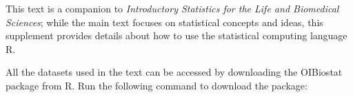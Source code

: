 % 
% 
% 
% 
% 
% 






\vspace{1cm}
This text is a companion to \textit{Introductory Statistics for the Life and Biomedical Sciences}; while the main text focuses on statistical concepts and ideas, this supplement provides details about how to use the statistical computing language \textsf{R}.

All the datasets used in the text can be accessed by downloading the OIBiostat package from \textsf{R}. Run the following command to download the package:

\begin{knitrout}
\color{fgcolor}\begin{kframe}
\begin{alltt}
\hlstd{(}\hlstd{)}  
\end{alltt}
\end{kframe}
\end{knitrout}

